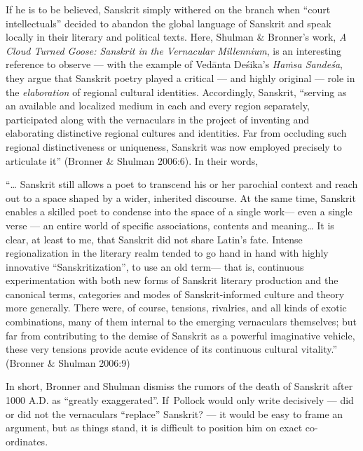 If he is to be believed, Sanskrit simply withered on the branch when “court intellectuals” decided to abandon the global language of Sanskrit and speak locally in their literary and political texts. Here, Shulman \& Bronner’s work, {\sl A Cloud Turned Goose: Sanskrit in the Vernacular Millennium}, is an interesting reference to observe — with the example of Vedānta Deśika’s {\sl Haṁsa Sandeśa}, they argue that Sanskrit poetry played a critical — and highly original — role in the {\sl elaboration} of regional cultural identities. Accordingly, Sanskrit, “serving as an available and localized medium in each and every region separately, participated along with the vernaculars in the project of inventing and elaborating distinctive regional cultures and identities. Far from occluding such regional distinctiveness or uniqueness, Sanskrit was now employed precisely to articulate it” (Bronner \& Shulman 2006:6). In their words,
\begin{myquote}
“… Sanskrit still allows a poet to transcend his or her parochial context and reach out to a space shaped by a wider, inherited discourse. At the same time, Sanskrit enables a skilled poet to condense into the space of a single work— even a single verse — an entire world of specific associations, contents and meaning… It is clear, at least to me, that Sanskrit did not share Latin’s fate. Intense regionalization in the literary realm tended to go hand in hand with highly innovative “Sanskritization”, to use an old term— that is, continuous experimentation with both new forms of Sanskrit literary production and the canonical terms, categories and modes of Sanskrit-informed culture and theory more generally. There were, of course, tensions, rivalries, and all kinds of exotic combinations, many of them internal to the emerging vernaculars themselves; but far from contributing to the demise of Sanskrit as a powerful imaginative vehicle, these very tensions provide acute evidence of its continuous cultural vitality.”	
\hfill{(Bronner \& Shulman 2006:9)}
\end{myquote}

In short, Bronner and Shulman dismiss the rumors of the death of Sanskrit after 1000 A.D. as “greatly exaggerated”. If\, Pollock would only write decisively — did or did not the vernaculars “replace” Sanskrit? — it would be easy to frame an argument, but as things stand, it is difficult to position him on exact co-ordinates.\\[-20pt] 

